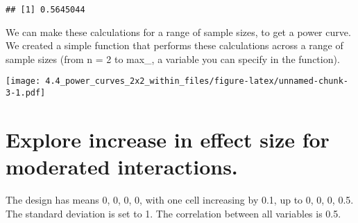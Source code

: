 \documentclass[]{article}
\newenvironment{Shaded}{\begin{snugshade}}{\end{snugshade}}
\newcommand{\KeywordTok}[1]{\textcolor[rgb]{0.13,0.29,0.53}{\textbf{#1}}}
\newcommand{\DataTypeTok}[1]{\textcolor[rgb]{0.13,0.29,0.53}{#1}}
\newcommand{\DecValTok}[1]{\textcolor[rgb]{0.00,0.00,0.81}{#1}}
\newcommand{\FloatTok}[1]{\textcolor[rgb]{0.00,0.00,0.81}{#1}}
\newcommand{\StringTok}[1]{\textcolor[rgb]{0.31,0.60,0.02}{#1}}
\newcommand{\OperatorTok}[1]{\textcolor[rgb]{0.81,0.36,0.00}{\textbf{#1}}}
\newcommand{\NormalTok}[1]{#1}
\begin{document}
\begin{verbatim}
## [1] 0.5645044
\end{verbatim}

We can make these calculations for a range of sample sizes, to get a
power curve. We created a simple function that performs these
calculations across a range of sample sizes (from n = 2 to max\_, a
variable you can specify in the function).

\begin{Shaded}
\end{Shaded}

\texttt{[image: 4.4\_power\_curves\_2x2\_within\_files/figure-latex/unnamed-chunk-3-1.pdf]}

\section{Explore increase in effect size for moderated
interactions.}\label{explore-increase-in-effect-size-for-moderated-interactions.}

The design has means 0, 0, 0, 0, with one cell increasing by 0.1, up to
0, 0, 0, 0.5. The standard deviation is set to 1. The correlation
between all variables is 0.5.
\end{document}

